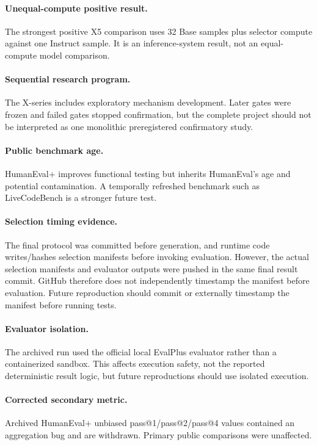 \documentclass[11pt]{article}
\begin{document}
\paragraph{Unequal-compute positive result.}
The strongest positive X5 comparison uses 32 Base samples plus selector compute against one Instruct sample. It is an inference-system result, not an equal-compute model comparison.

\paragraph{Sequential research program.}
The X-series includes exploratory mechanism development. Later gates were frozen and failed gates stopped confirmation, but the complete project should not be interpreted as one monolithic preregistered confirmatory study.

\paragraph{Public benchmark age.}
HumanEval+ improves functional testing but inherits HumanEval's age and potential contamination. A temporally refreshed benchmark such as LiveCodeBench is a stronger future test.

\paragraph{Selection timing evidence.}
The final protocol was committed before generation, and runtime code writes/hashes selection manifests before invoking evaluation. However, the actual selection manifests and evaluator outputs were pushed in the same final result commit. GitHub therefore does not independently timestamp the manifest before evaluation. Future reproduction should commit or externally timestamp the manifest before running tests.

\paragraph{Evaluator isolation.}
The archived run used the official local EvalPlus evaluator rather than a containerized sandbox. This affects execution safety, not the reported deterministic result logic, but future reproductions should use isolated execution.

\paragraph{Corrected secondary metric.}
Archived HumanEval+ unbiased pass@1/pass@2/pass@4 values contained an aggregation bug and are withdrawn. Primary public comparisons were unaffected.
\end{document}

